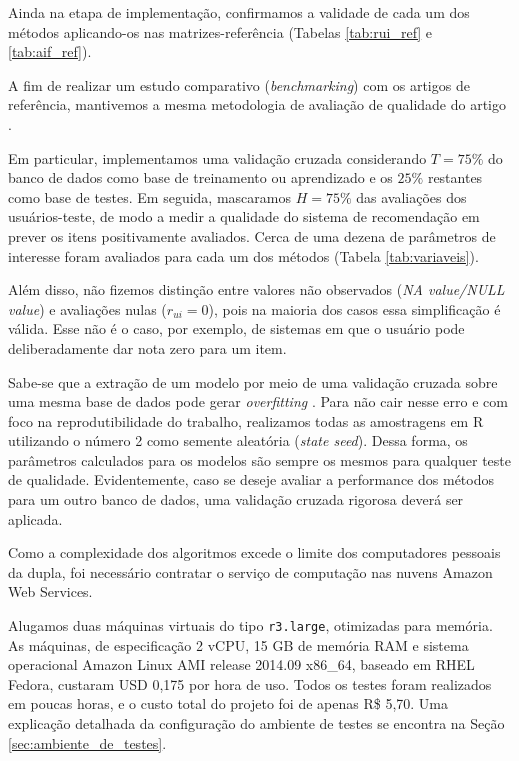Ainda na etapa de implementação, confirmamos a validade de cada um dos métodos aplicando-os nas matrizes-referência (Tabelas \ref{tab:rui_ref} e \ref{tab:aif_ref}). 


A fim de realizar um estudo comparativo (\textit{benchmarking}) com os artigos de referência, mantivemos a mesma metodologia de avaliação de qualidade do artigo .

Em particular, implementamos uma validação cruzada considerando $T=75\%$ do banco de dados como base de treinamento ou aprendizado e os $25\%$ restantes como base de testes. Em seguida, mascaramos $H=75\%$ das avaliações dos usuários-teste, de modo a medir a qualidade do sistema de recomendação em prever os itens positivamente avaliados. Cerca de uma dezena de parâmetros de interesse foram avaliados para cada um dos métodos (Tabela \ref{tab:variaveis}). 

Além disso, não fizemos distinção entre valores não observados (\textit{NA value/NULL value}) e avaliações nulas ($r_{ui}=0$), pois na maioria dos casos essa simplificação é válida. Esse não é o caso, por exemplo, de sistemas em que o usuário pode deliberadamente dar  nota zero para um item.

Sabe-se que a extração de um modelo por meio de uma validação cruzada sobre uma mesma base de dados pode gerar \textit{overfitting} \cite{ng1997preventing}. Para não cair nesse erro e com foco na reprodutibilidade do trabalho, realizamos todas as amostragens em R utilizando o número 2 como semente aleatória (\textit{state seed}). Dessa forma, os parâmetros calculados para os modelos são sempre os mesmos para qualquer teste de qualidade. Evidentemente, caso se deseje avaliar a performance dos métodos para um outro banco de dados, uma validação cruzada rigorosa deverá ser aplicada. 



Como a complexidade dos algoritmos excede o limite dos computadores pessoais da dupla, foi necessário contratar o serviço de computação nas nuvens Amazon Web Services.

Alugamos duas máquinas virtuais do tipo \texttt{r3.large}, otimizadas para memória. As máquinas, de especificação 2 vCPU, 15 GB de memória RAM e sistema operacional Amazon Linux AMI release 2014.09 x86\_64, baseado em RHEL Fedora, custaram USD 0,175 por hora de uso. Todos os testes foram realizados em poucas horas, e o custo total do projeto foi de apenas R\$ 5,70. Uma explicação detalhada da configuração do ambiente de testes se encontra na Seção \ref{sec:ambiente_de_testes}.